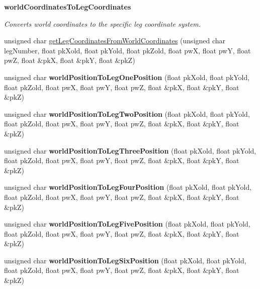 \begin{Indent}\textbf{ world\+Coordinates\+To\+Leg\+Coordinates}\par
{\em Converts world coordinates to the specific leg coordinate system. }\begin{DoxyCompactItemize}
\item 
unsigned char \mbox{\hyperlink{class_movement_controller_a0710b423644d46f7391e4b75c5879559}{get\+Leg\+Coordinates\+From\+World\+Coordinates}} (unsigned char leg\+Number, float pk\+Xold, float pk\+Yold, float pk\+Zold, float pwX, float pwY, float pwZ, float \&pkX, float \&pkY, float \&pkZ)
\item 
\mbox{\label{class_movement_controller_a328939445cf5c8f7878e9fd44fde3c96}} 
unsigned char {\bfseries world\+Position\+To\+Leg\+One\+Position} (float pk\+Xold, float pk\+Yold, float pk\+Zold, float pwX, float pwY, float pwZ, float \&pkX, float \&pkY, float \&pkZ)
\item 
\mbox{\label{class_movement_controller_a715ebda5d6d77f1763d0288268caf5ae}} 
unsigned char {\bfseries world\+Position\+To\+Leg\+Two\+Position} (float pk\+Xold, float pk\+Yold, float pk\+Zold, float pwX, float pwY, float pwZ, float \&pkX, float \&pkY, float \&pkZ)
\item 
\mbox{\label{class_movement_controller_a1c4c708534a712257c7282638568e9ee}} 
unsigned char {\bfseries world\+Position\+To\+Leg\+Three\+Position} (float pk\+Xold, float pk\+Yold, float pk\+Zold, float pwX, float pwY, float pwZ, float \&pkX, float \&pkY, float \&pkZ)
\item 
\mbox{\label{class_movement_controller_a5ebb5b6f2242350310aede085140cffe}} 
unsigned char {\bfseries world\+Position\+To\+Leg\+Four\+Position} (float pk\+Xold, float pk\+Yold, float pk\+Zold, float pwX, float pwY, float pwZ, float \&pkX, float \&pkY, float \&pkZ)
\item 
\mbox{\label{class_movement_controller_ad57ba364952a497b5772c67cc27ed797}} 
unsigned char {\bfseries world\+Position\+To\+Leg\+Five\+Position} (float pk\+Xold, float pk\+Yold, float pk\+Zold, float pwX, float pwY, float pwZ, float \&pkX, float \&pkY, float \&pkZ)
\item 
\mbox{\label{class_movement_controller_ac8928ae991954ef78fc32c9faa0d0c54}} 
unsigned char {\bfseries world\+Position\+To\+Leg\+Six\+Position} (float pk\+Xold, float pk\+Yold, float pk\+Zold, float pwX, float pwY, float pwZ, float \&pkX, float \&pkY, float \&pkZ)
\end{DoxyCompactItemize}
\end{Indent}
